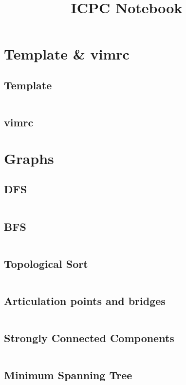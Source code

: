 \documentclass[a4paper, 10pt, twocolumn, landscape]{article}
\title{ICPC Notebook}
\begin{document}
  \pagestyle{fancy}

  \setlength{\columnseprule}{1pt}
  \large

  \maketitle
  \tableofcontents

  \section{Template \& vimrc}
  \subsection{Template}
  \inputminted{cpp}{template.cpp}
  \subsection{vimrc}
  

  \section{Graphs}
  \subsection{DFS}
  \inputminted{cpp}{graphs/dfs.cpp}
  \subsection{BFS}
  \inputminted{cpp}{graphs/bfs.cpp}
  \subsection{Topological Sort}
  \inputminted{cpp}{graphs/kahn.cpp}
  \subsection{Articulation points and bridges}
  \inputminted{cpp}{graphs/articulation.cpp}
  \subsection{Strongly Connected Components}
  \inputminted{cpp}{graphs/kosaraju.cpp}
  \subsection{Minimum Spanning Tree}
  \inputminted{cpp}{graphs/kruskal.cpp}
  \inputminted{cpp}{graphs/prim.cpp}
\end{document}
